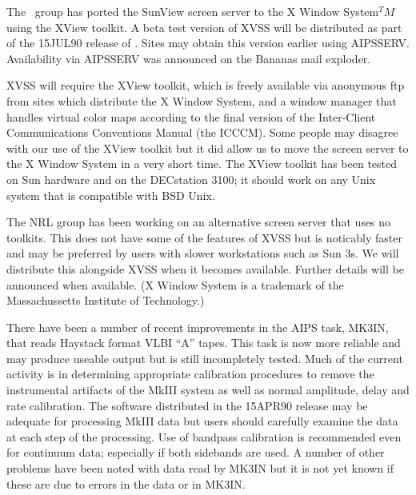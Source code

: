 The \AIPS\ group has ported the SunView screen server to the X Window
System$^TM$ using the XView toolkit. A beta test version of XVSS will
be distributed as part of the 15JUL90 release of \AIPS. Sites may
obtain this version earlier using AIPSSERV. Availability via AIPSSERV
was announced on the Bananas mail exploder.

XVSS will require the XView toolkit, which is freely available via
anonymous ftp from sites which distribute the X Window System, and
a window manager that handles virtual color maps according to the
final version of the Inter-Client Communications Conventions Manual
(the ICCCM). Some people may disagree with our use of the XView
toolkit but it did allow us to move the screen server to the X Window
System in a very short time. The XView toolkit has been tested on
Sun hardware and on the DECstation 3100; it should work on any Unix
system that is compatible with BSD Unix.

The NRL group has been working on an alternative screen server that uses no
toolkits. This does not have some of the features of XVSS but is
noticably faster and may be preferred by users with slower workstations
such as Sun 3s. We will distribute this alongside XVSS when it becomes
available. Further details will be announced when available.
(X Window System is a trademark of the Massachussetts Institute of
Technology.)


   There have been a number of recent improvements in the AIPS task,
MK3IN, that reads Haystack format VLBI ``A'' tapes.  This task is now
more reliable and may produce useable output but is still incompletely
tested.  Much of the current activity is in determining appropriate
calibration procedures to remove the instrumental artifacts of the MkIII
system as well as normal amplitude, delay and rate calibration.  The
software distributed in the 15APR90 release may be adequate for
processing MkIII data but users should carefully examine the data at
each step of the processing.  Use of bandpass calibration is
recommended even for continuum data; especially if both sidebands are
used.  A number of other problems have been noted with data read by
MK3IN but it is not yet known if these are due to errors in the data
or in MK3IN.


